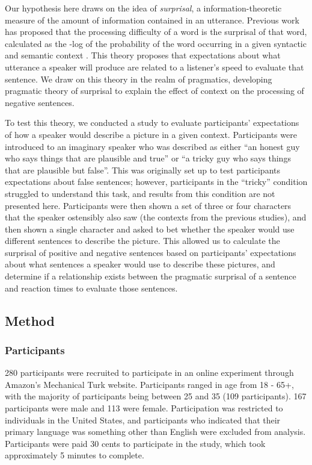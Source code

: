 \documentclass[10pt,letterpaper]{article}
\begin{document}
Our hypothesis here draws on the idea of \emph{surprisal}, a information-theoretic measure of the amount of information contained in an utterance.  Previous work has proposed that the processing difficulty of a word is the surprisal of that word, calculated as the -log of the probability of the word occurring in a given syntactic and semantic context \cite{levy2008}.  This theory proposes that expectations about what utterance a speaker will produce are related to a listener's speed to evaluate that sentence.  We draw on this theory in the realm of pragmatics, developing pragmatic theory of surprisal to explain the effect of context on the processing of negative sentences.  

To test this theory, we conducted a study to evaluate participants' expectations of how a speaker would describe a picture in a given context.  Participants were introduced to an imaginary speaker who was described as either ``an honest guy who says things that are plausible and true'' or ``a tricky guy who says things that are plausible but false''.  This was originally set up to test participants expectations about false sentences; however, participants in the ``tricky'' condition struggled to understand this task, and results from this condition are not presented here.  Participants were then shown a set of three or four characters that the speaker ostensibly also saw (the contexts from the previous studies), and then shown a single character and asked to bet whether the speaker would use different sentences to describe the picture.  This allowed us to calculate the surprisal of positive and negative sentences based on participants' expectations about what sentences a speaker would use to describe these pictures, and determine if a relationship exists between the pragmatic surprisal of a sentence and reaction times to evaluate those sentences.  

\subsection{Method}

\subsubsection{Participants}
280 participants were recruited to participate in an online experiment through Amazon's Mechanical Turk website.  Participants ranged in age from 18 - 65+, with the majority of participants being between 25 and 35 (109 participants).  167 participants were male and 113 were female.  Participation was restricted to individuals in the United States, and participants who indicated that their primary language was something other than English were excluded from analysis.  Participants were paid 30 cents to participate in the study, which took approximately 5 minutes to complete.  
\end{document}
